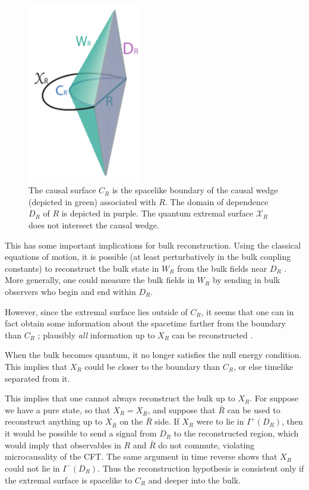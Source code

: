 \documentclass[12pt]{article}
\theoremstyle{remark}
\numberwithin{equation}{section}
\numberwithin{equation}{section}
\begin{document}
\begin{figure}[t]
\begin{center}
\includegraphics[width=5cm]{CausalSurfacev3.pdf} 
\caption{{\small The causal surface $C_R$ is the spacelike boundary of the causal wedge (depicted in green) associated with $R$. The domain of dependence $D_{R}$ of $R$ is depicted in purple. The quantum extremal surface $\mathcal{X}_{R}$ does not intersect the causal wedge.}}
\label{CS}
\end{center}
\end{figure}

This has some important implications for bulk reconstruction.  Using the classical equations of motion, it is possible (at least perturbatively in the bulk coupling constants) to reconstruct the bulk state in $W_R$ from the bulk fields near $D_R$ \cite{HubenyRangamani, 59, Bousso:2012sj}.  More generally, one could measure the bulk fields in $W_R$ by sending in bulk observers who begin and end within $D_R$.

However, since the extremal surface lies outside of $C_R$, it seems that one can in fact obtain some information about the spacetime farther from the boundary than $C_R$ \cite{HubenyRangamani,Czech:2012bh}; plausibly \emph{all} information up to $X_R$ can be reconstructed \cite{Wall12}.

When the bulk becomes quantum, it no longer satisfies the null energy condition.  This implies that $X_R$ could be closer to the boundary than $C_R$, or else timelike separated from it.

This implies that one cannot always reconstruct the bulk up to $X_R$.  For suppose we have a pure state, so that $X_R = X_{\bar R}$, and suppose that ${\bar R}$ can be used to reconstruct anything up to $X_{\bar R}$ on the ${\bar R}$ side.  If $X_R$ were to lie in $I^+(D_R)$, then it would be possible to send a signal from $D_R$ to the reconstructed region, which would imply that observables in $R$ and ${\bar R}$ do not commute, violating microcausality of the CFT.  The same argument in time reverse shows that $X_R$ could not lie in $I^-(D_R)$.  Thus the reconstruction hypothesis is consistent only if the extremal surface is spacelike to $C_R$ and deeper into the bulk.
\end{document}
